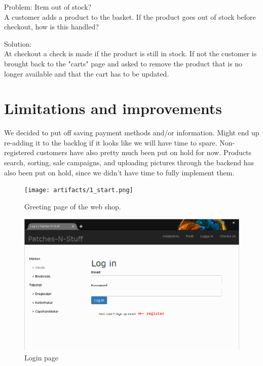 \documentclass[paper=a4, fontsize=11pt]{report} %
\begin{document}
\begin{itemize}
	Problem: Item out of stock? \\
		A customer adds a product to the basket. If the product goes out of
		stock before checkout, how is this handled?

	Solution: \\
		At checkout a check is made if the product is still in stock. If not
		the customer is brought back to the "carts" page and asked to remove
		the product that is no longer available and that the cart has to be
		updated.

\section*{Limitations and improvements}

	We decided to put off saving payment methods and/or information. Might
	end up re-adding it to the backlog if it looks like we will have time
	to spare. Non-registered customers have also pretty much been put on hold for now.
	Products search, sorting, sale campaigns, and uploading pictures
	through the backend has also been put on hold, since we didn't have
	time to fully implement them.


\begin{figure}
	\texttt{[image: artifacts/1\_start.png]}
	\caption{Greeting page of the web shop.}
	\label{fig:start}
\end{figure}

\begin{figure}
	\includegraphics[width=0.9\paperwidth]{artifacts/stories/2_login.png}
	\caption{Login page}
	\label{fig:login}
\end{figure}


\end{itemize}
\end{document}
